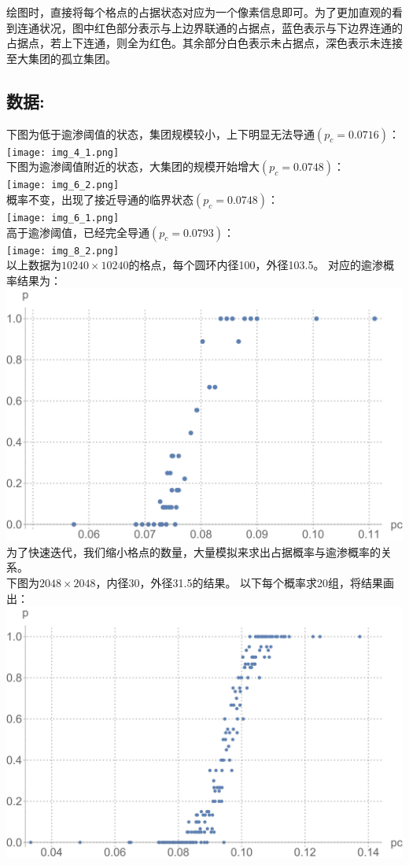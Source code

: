 \documentclass[utf8]{ctexart}
\begin{document}
	绘图时，直接将每个格点的占据状态对应为一个像素信息即可。为了更加直观的看到连通状况，图中红色部分表示与上边界联通的占据点，蓝色表示与下边界连通的占据点，若上下连通，则全为红色。其余部分白色表示未占据点，深色表示未连接至大集团的孤立集团。
	
	\subsection*{数据:}
	\noindent
	下图为低于逾渗阈值的状态，集团规模较小，上下明显无法导通$(p_c=0.0716)$：\\
	\texttt{[image: img\_4\_1.png]}\\
	\clearpage
	下图为逾渗阈值附近的状态，大集团的规模开始增大$(p_c=0.0748)$：\\
	\texttt{[image: img\_6\_2.png]}\\
	\clearpage
	概率不变，出现了接近导通的临界状态$(p_c=0.0748)$：\\
	\texttt{[image: img\_6\_1.png]}\\
	\clearpage
	高于逾渗阈值，已经完全导通$(p_c=0.0793)$：\\
	\texttt{[image: img\_8\_2.png]}\\
	\clearpage
	\noindent 以上数据为$10240\times10240$的格点，每个圆环内径100，外径103.5。
	对应的逾渗概率结果为：\\
	\includegraphics[width=\textwidth]{fig1.jpg}\\
	为了快速迭代，我们缩小格点的数量，大量模拟来求出占据概率与逾渗概率的关系。\\
	下图为$2048\times2048$，内径30，外径31.5的结果。
	以下每个概率求20组，将结果画出：\\
	\includegraphics[width=\textwidth]{fig2.jpg}\\
\end{document}
